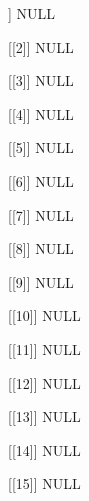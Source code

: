 \documentclass[
]{article}
\begin{document}
\newpage
[[1]

{]} NULL

{[}{[}2{]}{]} NULL

{[}{[}3{]}{]} NULL

{[}{[}4{]}{]} NULL

{[}{[}5{]}{]} NULL

{[}{[}6{]}{]} NULL

{[}{[}7{]}{]} NULL

{[}{[}8{]}{]} NULL

{[}{[}9{]}{]} NULL

{[}{[}10{]}{]} NULL

{[}{[}11{]}{]} NULL

{[}{[}12{]}{]} NULL

{[}{[}13{]}{]} NULL

{[}{[}14{]}{]} NULL

{[}{[}15{]}{]} NULL
\end{document}
